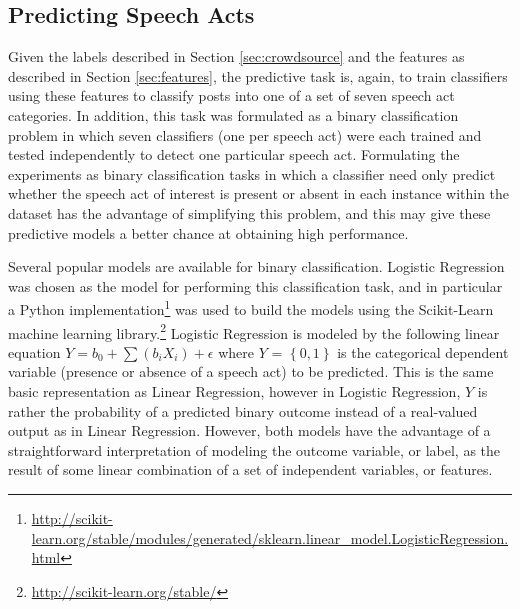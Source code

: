 \documentclass[twoside]{article}
\begin{document}
\subsection{Predicting Speech Acts}\label{sec:prediction}
Given the labels described in Section \ref{sec:crowdsource} and the features as described in Section \ref{sec:features}, the predictive task is, again, to train classifiers using these features to classify posts into one of a set of seven speech act categories. In addition, this task was formulated as a binary classification problem in which seven classifiers (one per speech act) were each trained and tested independently to detect one particular speech act. Formulating the experiments as binary classification tasks in which a classifier need only predict whether the speech act of interest is present or absent in each instance within the dataset has the advantage of  simplifying this problem, and this may give these predictive models a better chance at obtaining high performance.
\par
Several popular models are available for binary classification. Logistic Regression was chosen as the model for performing this classification task, and in particular a Python implementation\footnote{\url{http://scikit-learn.org/stable/modules/generated/sklearn.linear_model.LogisticRegression.html}} was used to build the models using the Scikit-Learn machine learning library.\footnote{\url{http://scikit-learn.org/stable/}} Logistic Regression is modeled by the following linear equation $Y=b_0+\sum{(b_i X_i)}+\epsilon$ where $Y$ = $\left\{ {0,1} \right\}$ is the categorical dependent variable (presence or absence of a speech act) to be predicted. This is the same basic representation as Linear Regression, however in Logistic Regression, $Y$ is rather the probability of a predicted binary outcome instead of a real-valued output as in Linear Regression. However, both models have the advantage of a straightforward interpretation of modeling the outcome variable, or label, as the result of some linear combination of a set of independent variables, or features.
\par
\end{document}
